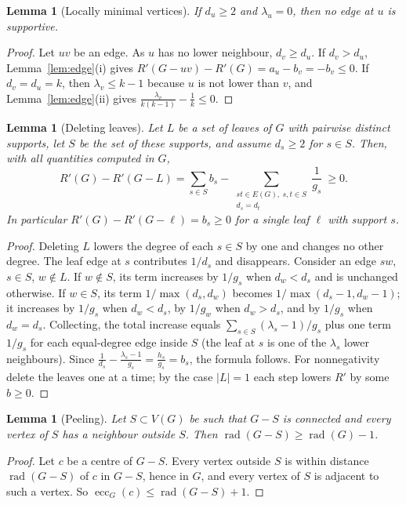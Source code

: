 \documentclass[11pt]{amsart}
\newtheorem{lemma}[theorem]{Lemma}
\theoremstyle{definition}
\DeclareMathOperator{\rad}{rad}
\DeclareMathOperator{\ecc}{ecc}
\newcommand{\Rp}{R'}
\begin{document}
\begin{lemma}[Locally minimal vertices]\label{lem:locmin}
If $d_u\ge2$ and $\lambda_u=0$, then no edge at $u$ is supportive.
\end{lemma}

\begin{proof}
Let $uv$ be an edge. As $u$ has no lower neighbour, $d_v\ge d_u$. If $d_v>d_u$, Lemma~\ref{lem:edge}(i) gives
$\Rp(G-uv)-\Rp(G)=a_u-b_v=-b_v\le0$. If $d_v=d_u=k$, then $\lambda_v\le k-1$ because $u$ is not lower than $v$, and
Lemma~\ref{lem:edge}(ii) gives $\frac{\lambda_v}{k(k-1)}-\frac1k\le0$.
\end{proof}

\begin{lemma}[Deleting leaves]\label{lem:leaves}
Let $L$ be a set of leaves of $G$ with pairwise distinct supports, let $S$ be the set of these supports, and assume
$d_s\ge2$ for $s\in S$. Then, with all quantities computed in $G$,
\[
\Rp(G)-\Rp(G-L)=\sum_{s\in S}b_s-\sum_{\substack{st\in E(G),\ s,t\in S\\ d_s=d_t}}\frac1{g_s}\ \ge 0 .
\]
In particular $\Rp(G)-\Rp(G-\ell)=b_s\ge0$ for a single leaf $\ell$ with support $s$.
\end{lemma}

\begin{proof}
Deleting $L$ lowers the degree of each $s\in S$ by one and changes no other degree. The leaf edge at $s$ contributes
$1/d_s$ and disappears. Consider an edge $sw$, $s\in S$, $w\notin L$. If $w\notin S$, its term increases by $1/g_s$
when $d_w<d_s$ and is unchanged otherwise. If $w\in S$, its term $1/\max(d_s,d_w)$ becomes
$1/\max(d_s-1,d_w-1)$; it increases by $1/g_s$ when $d_w<d_s$, by $1/g_w$ when $d_w>d_s$, and by $1/g_s$ when
$d_w=d_s$. Collecting, the total increase equals $\sum_{s\in S}(\lambda_s-1)/g_s$ plus one term $1/g_s$ for each
equal-degree edge inside $S$ (the leaf at $s$ is one of the $\lambda_s$ lower neighbours). Since
$\frac1{d_s}-\frac{\lambda_s-1}{g_s}=\frac{h_s}{g_s}=b_s$, the formula follows. For nonnegativity delete the
leaves one at a time; by the case $|L|=1$ each step lowers $\Rp$ by some $b\ge0$.
\end{proof}

\begin{lemma}[Peeling]\label{lem:peel}
Let $S\subset V(G)$ be such that $G-S$ is connected and every vertex of $S$ has a neighbour outside $S$. Then
$\rad(G-S)\ge\rad(G)-1$.
\end{lemma}

\begin{proof}
Let $c$ be a centre of $G-S$. Every vertex outside $S$ is within distance $\rad(G-S)$ of $c$ in $G-S$, hence in $G$,
and every vertex of $S$ is adjacent to such a vertex. So $\ecc_G(c)\le\rad(G-S)+1$.
\end{proof}
\end{document}
